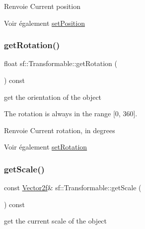 \begin{DoxyReturn}{Renvoie}
Current position
\end{DoxyReturn}
\begin{DoxySeeAlso}{Voir également}
\hyperlink{classsf_1_1Transformable_a4dbfb1a7c80688b0b4c477d706550208}{set\+Position} 
\end{DoxySeeAlso}
\mbox{\label{classsf_1_1Transformable_aa00b5c5d4a06ac24a94dd72c56931d3a}} 
\subsubsection{\texorpdfstring{get\+Rotation()}{getRotation()}}
{\footnotesize\ttfamily float sf\+::\+Transformable\+::get\+Rotation (\begin{DoxyParamCaption}{ }\end{DoxyParamCaption}) const}



get the orientation of the object 

The rotation is always in the range \mbox{[}0, 360\mbox{]}.

\begin{DoxyReturn}{Renvoie}
Current rotation, in degrees
\end{DoxyReturn}
\begin{DoxySeeAlso}{Voir également}
\hyperlink{classsf_1_1Transformable_a32baf2bf1a74699b03bf8c95030a38ed}{set\+Rotation} 
\end{DoxySeeAlso}
\mbox{\label{classsf_1_1Transformable_a73819fdea80ca8a06fad8a0067b4588c}} 
\subsubsection{\texorpdfstring{get\+Scale()}{getScale()}}
{\footnotesize\ttfamily const \hyperlink{classsf_1_1Vector2}{Vector2f}\& sf\+::\+Transformable\+::get\+Scale (\begin{DoxyParamCaption}{ }\end{DoxyParamCaption}) const}



get the current scale of the object 

